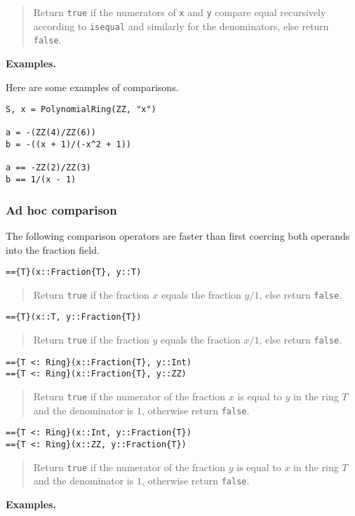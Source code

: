 \documentclass[a4paper,10pt]{article}
\newcommand{\code}{\lstinline}
\newcommand{\desc}[1]{\vspace{-3mm}\begin{quote}#1\end{quote}}
\begin{document}
{{\desc{Return \code{true} if the numerators of \code{x} and \code{y} compare
equal recursively according to \code{isequal} and similarly for the
denominators, else return \code{false}.}

\textbf{Examples.}

Here are some examples of comparisons.

\begin{lstlisting}
S, x = PolynomialRing(ZZ, "x")

a = -(ZZ(4)/ZZ(6))
b = -((x + 1)/(-x^2 + 1))

a == -ZZ(2)/ZZ(3)
b == 1/(x - 1)
\end{lstlisting}

\subsubsection{Ad hoc comparison}

The following comparison operators are faster than first coercing both
operands into the fraction field.

\begin{lstlisting}
=={T}(x::Fraction{T}, y::T)
\end{lstlisting}

\desc{Return \code{true} if the fraction $x$ equals the fraction $y/1$, else
return \code{false}.}

\begin{lstlisting}
=={T}(x::T, y::Fraction{T})
\end{lstlisting}

\desc{Return \code{true} if the fraction $y$ equals the fraction $x/1$, else
return \code{false}.}

\begin{lstlisting}
=={T <: Ring}(x::Fraction{T}, y::Int)
=={T <: Ring}(x::Fraction{T}, y::ZZ)
\end{lstlisting}

\desc{Return \code{true} if the numerator of the fraction $x$ is equal to $y$
in the ring $T$ and the denominator is $1$, otherwise return \code{false}.}

\begin{lstlisting}
=={T <: Ring}(x::Int, y::Fraction{T})
=={T <: Ring}(x::ZZ, y::Fraction{T})
\end{lstlisting}

\desc{Return \code{true} if the numerator of the fraction $y$ is equal to $x$
in the ring $T$ and the denominator is $1$, otherwise return \code{false}.}

\textbf{Examples.}

}}
\end{document}
